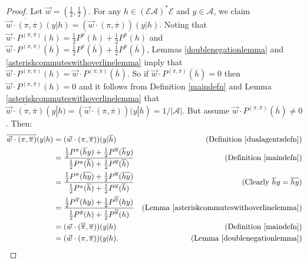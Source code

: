 \documentclass[twoside]{article}
\begin{document}
\begin{proof}
    Let $\vec w=(\frac12,\frac12)$.
    For any $h\in(\mathcal E\mathcal A)^*\mathcal E$ and $y\in\mathcal A$,
    we claim
    $\overline{\vec w\cdot(\pi,\overline{\pi})}(y|h)
    =(\vec w\cdot(\pi,\overline{\pi}))(y|h)$.
    Noting that
    $\vec w\cdot P^{(\pi,\overline{\pi})}(h)
    =\frac12P^\pi(h)+\frac12P^{\overline\pi}(h)$
    and
    $\vec w\cdot P^{(\pi,\overline{\pi})}(\overline h)
    =\frac12P^\pi(\overline h)+\frac12P^{\overline\pi}(\overline h)$,
    Lemmas \ref{doublenegationlemma} and \ref{asteriskcommuteswithoverlinelemma}
    imply that
    $\vec w\cdot P^{(\pi,\overline{\pi})}(h)
    =\vec w\cdot P^{(\pi,\overline{\pi})}(\overline h)$.
    So if
    $\vec w\cdot P^{(\pi,\overline{\pi})}(\overline h)=0$
    then $\vec w\cdot P^{(\pi,\overline{\pi})}(h)=0$
    and it follows from
    Definition \ref{maindefn}
    and Lemma \ref{asteriskcommuteswithoverlinelemma} that
    $\overline{\vec w\cdot(\pi,\overline{\pi})}(y|h)
    =(\vec w\cdot(\pi,\overline{\pi}))(y|h)=1/|\mathcal A|$.
    But assume $\vec w\cdot P^{(\pi,\overline{\pi})}(\overline h)\not=0$.
    Then:
    \begin{align*}
        \overline{\vec w\cdot(\pi,\overline{\pi})}(y|h)
        &= (\vec w\cdot(\pi,\overline{\pi}))(y|\overline h)
            &\mbox{(Definition \ref{dualagentsdefn})}\\
        &= \frac
            {\frac12P^\pi(\overline hy)+\frac12P^{\overline\pi}(\overline hy)}
            {\frac12P^\pi(\overline h)+\frac12P^{\overline\pi}(\overline h)}
            &\mbox{(Definition \ref{maindefn})}\\
        &= \frac
            {\frac12P^\pi(\overline{hy})+\frac12P^{\overline\pi}(\overline{hy})}
            {\frac12P^\pi(\overline h)+\frac12P^{\overline\pi}(\overline h)}
            &\mbox{(Clearly $\overline hy=\overline{hy}$)}\\
        &= \frac
            {\frac12P^{\overline\pi}(hy)+\frac12P^{\overline{\overline\pi}}(hy)}
            {\frac12P^{\overline\pi}(h)+\frac12P^{\overline{\overline\pi}}(h)}
            &\mbox{(Lemma \ref{asteriskcommuteswithoverlinelemma})}\\
        &= (\vec w\cdot(\overline{\overline\pi},\overline\pi))(y|h)
            &\mbox{(Definition \ref{maindefn})}\\
        &= (\vec w\cdot(\pi,\overline\pi))(y|h).
            &\mbox{(Lemma \ref{doublenegationlemma})}
    \end{align*}
\end{proof}
\end{document}

